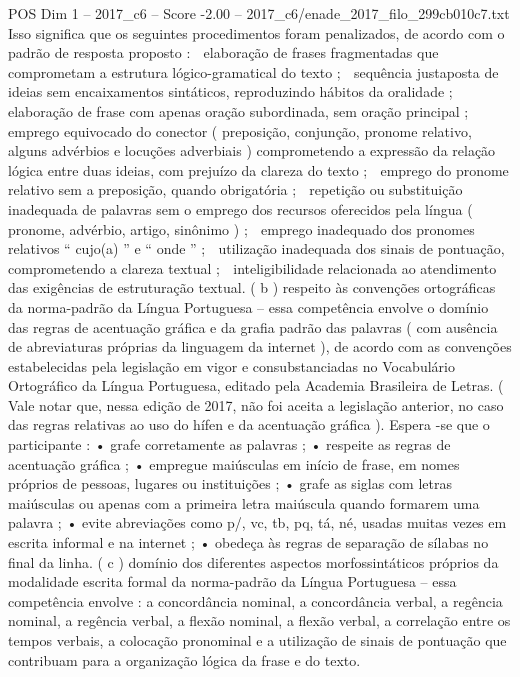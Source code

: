 \begin{textsample}{POS Dim 1 – 2017\_c6 – Score -2.00 – 2017\_c6/enade\_2017\_filo\_299cb010c7.txt}
Isso significa que os seguintes procedimentos foram penalizados, de acordo com o padrão de resposta proposto :  elaboração de frases fragmentadas que comprometam a estrutura lógico-gramatical do texto ;  sequência justaposta de ideias sem encaixamentos sintáticos, reproduzindo hábitos da oralidade ;  elaboração de frase com apenas oração subordinada, sem oração principal ;  emprego equivocado do conector ( preposição, conjunção, pronome relativo, alguns advérbios e locuções adverbiais ) comprometendo a expressão da relação lógica entre duas ideias, com prejuízo da clareza do texto ;  emprego do pronome relativo sem a preposição, quando obrigatória ;  repetição ou substituição inadequada de palavras sem o emprego dos recursos oferecidos pela língua ( pronome, advérbio, artigo, sinônimo ) ;  emprego inadequado dos pronomes relativos “ cujo(a) ” e “ onde ” ;  utilização inadequada dos sinais de pontuação, comprometendo a clareza textual ;  inteligibilidade relacionada ao atendimento das exigências de estruturação textual. ( b ) respeito às convenções ortográficas da norma-padrão da Língua Portuguesa – essa competência envolve o domínio das regras de acentuação gráfica e da grafia padrão das palavras ( com ausência de abreviaturas próprias da linguagem da internet ), de acordo com as convenções estabelecidas pela legislação em vigor e consubstanciadas no Vocabulário Ortográfico da Língua Portuguesa, editado pela Academia Brasileira de Letras. ( Vale notar que, nessa edição de 2017, não foi aceita a legislação anterior, no caso das regras relativas ao uso do hífen e da acentuação gráfica ).
Espera -se que o participante : • grafe corretamente as palavras ; • respeite as regras de acentuação gráfica ; • empregue maiúsculas em início de frase, em nomes próprios de pessoas, lugares ou instituições ; • grafe as siglas com letras maiúsculas ou apenas com a primeira letra maiúscula quando formarem uma palavra ; • evite abreviações como p/, vc, tb, pq, tá, né, usadas muitas vezes em escrita informal e na internet ; • obedeça às regras de separação de sílabas no final da linha. ( c ) domínio dos diferentes aspectos morfossintáticos próprios da modalidade escrita formal da norma-padrão da Língua Portuguesa – essa competência envolve : a concordância nominal, a concordância verbal, a regência nominal, a regência verbal, a flexão nominal, a flexão verbal, a correlação entre os tempos verbais, a colocação pronominal e a utilização de sinais de pontuação que contribuam para a organização lógica da frase e do texto.

\end{textsample}
